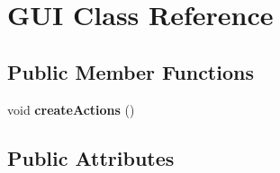 \hypertarget{classGUI}{
\section{GUI Class Reference}
\label{classGUI}
}
\subsection*{Public Member Functions}
\begin{DoxyCompactItemize}
\item 
\hypertarget{classGUI_a4dea1ac02163a2b98153c90cbf843e5c}{
void {\bfseries createActions} ()}
\label{classGUI_a4dea1ac02163a2b98153c90cbf843e5c}

\end{DoxyCompactItemize}
\subsection*{Public Attributes}

